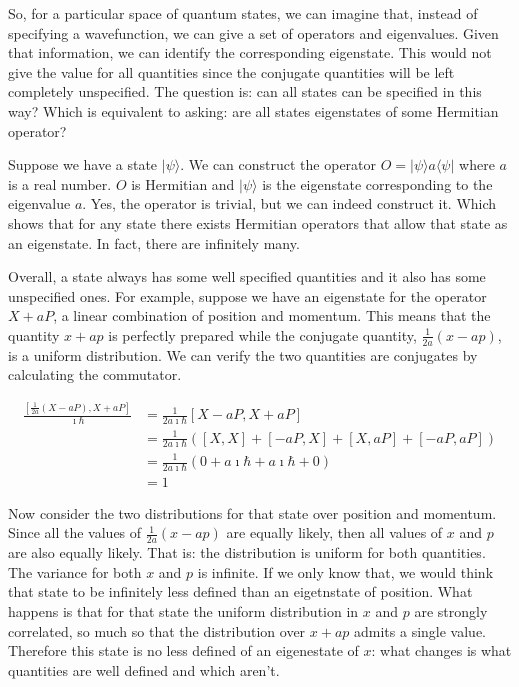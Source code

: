 \documentclass[aps,pra,10pt,floatfix,nofootinbib]{revtex4-1}
\theoremstyle{definition}
\begin{document}
So, for a particular space of quantum states, we can imagine that, instead of specifying a wavefunction, we can give a set of operators and eigenvalues. Given that information, we can identify the corresponding eigenstate. This would not give the value for all quantities since the conjugate quantities will be left completely unspecified. The question is: can all states can be specified in this way? Which is equivalent to asking: are all states eigenstates of some Hermitian operator?

Suppose we have a state $|\psi\rangle$. We can construct the operator $O=|\psi\rangle a \langle \psi |$ where $a$ is a real number. $O$ is Hermitian and $|\psi\rangle$ is the eigenstate corresponding to the eigenvalue $a$. Yes, the operator is trivial, but we can indeed construct it. Which shows that for any state there exists Hermitian operators that allow that state as an eigenstate. In fact, there are infinitely many.

Overall, a state always has some well specified quantities and it also has some unspecified ones. For example, suppose we have an eigenstate for the operator $X + a P$, a linear combination of position and momentum. This means that the quantity $x + ap$ is perfectly prepared while the conjugate quantity, $\frac{1}{2a}(x-ap)$, is a uniform distribution. We can verify the two quantities are conjugates by calculating the commutator.

\begin{equation}
\begin{aligned}
\frac{\left[\frac{1}{2a}(X-aP), X+aP \right]}{\imath \hbar} &= \frac{1}{2a \imath \hbar} \left[X-aP, X+aP\right] \\
 &= \frac{1}{2a \imath \hbar} \left( \left[X, X\right] + \left[-aP, X\right] + \left[X, aP\right] + \left[-aP, aP\right] \right) \\
&= \frac{1}{2a \imath \hbar} \left( 0 + a \imath \hbar + a \imath \hbar + 0 \right) \\
&= 1
\end{aligned}
\end{equation}

Now consider the two distributions for that state over position and momentum. Since all the values of $\frac{1}{2a}(x-ap)$ are equally likely, then all values of $x$ and $p$ are also equally likely. That is: the distribution is uniform for both quantities. The variance for both $x$ and $p$ is infinite. If we only know that, we would think that state to be infinitely less defined than an eigetnstate of position. What happens is that for that state the uniform distribution in $x$ and $p$ are strongly correlated, so much so that the distribution over $x+ap$ admits a single value. Therefore this state is no less defined of an eigenestate of $x$: what changes is what quantities are well defined and which aren't.
\end{document}
